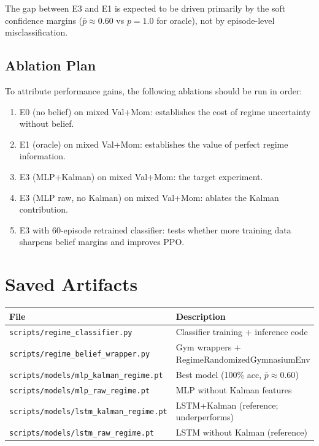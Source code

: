 \documentclass[11pt]{article}
\begin{document}
\noindent
The gap between E3 and E1 is expected to be driven primarily by the soft
confidence margins ($\bar{p} \approx 0.60$ vs $p = 1.0$ for oracle), not by
episode-level misclassification.

\subsection{Ablation Plan}

To attribute performance gains, the following ablations should be run in
order:

\begin{enumerate}
  \item E0 (no belief) on mixed Val+Mom: establishes the cost of regime
        uncertainty without belief.
  \item E1 (oracle) on mixed Val+Mom: establishes the value of perfect
        regime information.
  \item E3 (MLP+Kalman) on mixed Val+Mom: the target experiment.
  \item E3 (MLP raw, no Kalman) on mixed Val+Mom: ablates the Kalman
        contribution.
  \item E3 with 60-episode retrained classifier: tests whether more
        training data sharpens belief margins and improves PPO.
\end{enumerate}

\section{Saved Artifacts}

\begin{center}
\begin{tabular}{ll}
\toprule
\textbf{File} & \textbf{Description} \\
\midrule
\texttt{scripts/regime\_classifier.py}       & Classifier training + inference code \\
\texttt{scripts/regime\_belief\_wrapper.py}  & Gym wrappers + RegimeRandomizedGymnasiumEnv \\
\texttt{scripts/models/mlp\_kalman\_regime.pt} & Best model (100\% acc, $\bar{p}\approx 0.60$) \\
\texttt{scripts/models/mlp\_raw\_regime.pt}  & MLP without Kalman features \\
\texttt{scripts/models/lstm\_kalman\_regime.pt} & LSTM+Kalman (reference; underperforms) \\
\texttt{scripts/models/lstm\_raw\_regime.pt}  & LSTM without Kalman (reference) \\
\bottomrule
\end{tabular}
\end{center}
\end{document}
